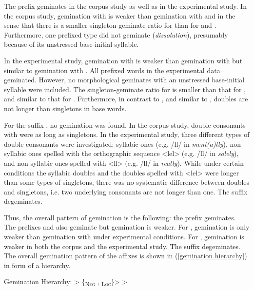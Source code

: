The prefix  geminates in the corpus study as well as in the experimental study. In the corpus study, gemination with  is weaker than gemination with  and  in the sense that there is a smaller singleton-geminate ratio for  than for  and . Furthermore, one prefixed type did not geminate (\textit{dissolution}), presumably because of its unstressed base-initial syllable. 

In the experimental study, gemination with  is weaker than gemination with  but similar to gemination with .
All prefixed words in the experimental data geminated. However, no morphological geminates with an unstressed base-initial syllable were included. 
The singleton-geminate ratio for  is smaller than that for , and similar to that for . 
Furthermore, in contrast to , and similar to , doubles are not longer than singletons in base words.  


For the suffix , no gemination was found. In the corpus study, double consonants with  were as long as singletons. In the experimental study, three different types of double consonants were investigated: syllabic ones (e.g. /ll/ in  \textit{ment(a)lly}), non-syllabic ones spelled with the orthographic sequence <lel> (e.g. /ll/ in \textit{solely}), and non-syllabic ones spelled with <ll> (e.g. /ll/ in \textit{really}). While under certain conditions the syllabic doubles and the doubles spelled with <lel> were longer than some types of singletons, there was no systematic difference between doubles and singletons, i.e. two underlying consonants are not longer than one. The suffix  degeminates.



Thus, the overall pattern of gemination is the following: the prefix  geminates. The prefixes  and   also geminate but gemination is weaker. For , gemination is only weaker than gemination with  under experimental conditions. For , gemination is weaker in both the corpus and the experimental study. The suffix  degeminates. The overall gemination pattern of the affixes is shown in (\ref{gemination hierarchy}) in form of a hierarchy.


\begin{exe}
	
	\ex \label{gemination hierarchy} {Gemination Hierarchy}: \hspace*{0.5cm}	{ > \{\textsubscript{\textsc{Neg}} ,  \textsubscript{\textsc{Loc}}\}>  > }
	
\end{exe}


